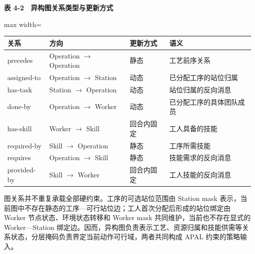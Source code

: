 \documentclass[journal,10pt]{IEEEtran}
\renewcommand{\arraystretch}{1.08}
\begin{document}
\begin{table}[!t]
\centering
\footnotesize
\textbf{表 4-2　异构图关系类型与更新方式}\par\smallskip
\setlength{\tabcolsep}{2pt}
\renewcommand{\arraystretch}{1.08}
\begin{adjustbox}{max width=\columnwidth}
\begin{tabular}{@{}
  >{\raggedright\arraybackslash}p{}
  >{\raggedright\arraybackslash}p{}
  >{\centering\arraybackslash}p{}
  >{\raggedright\arraybackslash}p{}@{}}
\toprule
\begin{minipage}[b]{\linewidth}\raggedright
关系
\end{minipage} & \begin{minipage}[b]{\linewidth}\raggedright
方向
\end{minipage} & \begin{minipage}[b]{\linewidth}\centering
更新方式
\end{minipage} & \begin{minipage}[b]{\linewidth}\raggedright
语义
\end{minipage} \\
\midrule
precedes & Operation \(\rightarrow\) Operation & 静态 & 工艺前序关系 \\
assigned-to & Operation \(\rightarrow\) Station & 动态 & 已分配工序的站位归属 \\
has-task & Station \(\rightarrow\) Operation & 动态 & 站位归属的反向消息 \\
done-by & Operation \(\rightarrow\) Worker & 动态 & 已分配工序的具体团队成员 \\
has-skill & Worker \(\rightarrow\) Skill & 回合内固定 & 工人具备的技能 \\
required-by & Skill \(\rightarrow\) Operation & 静态 & 工序所需技能 \\
requires & Operation \(\rightarrow\) Skill & 静态 & 技能需求的反向消息 \\
provided-by & Skill \(\rightarrow\) Worker & 回合内固定 & 工人技能的反向消息 \\
\bottomrule
\end{tabular}
\end{adjustbox}
\end{table}

图关系并不重复承载全部硬约束。工序的可选站位范围由 Station mask 表示，当前图中不存在静态的工序---可行站位边；工人首次分配后形成的站位绑定由 Worker 节点状态、环境状态转移和 Worker mask 共同维护，当前也不存在显式的 Worker---Station 绑定边。因而，异构图负责表示工艺、资源归属和技能供需等关系状态，分层掩码负责界定当前动作可行域，两者共同构成 APAL 约束的策略输入。
\end{document}
